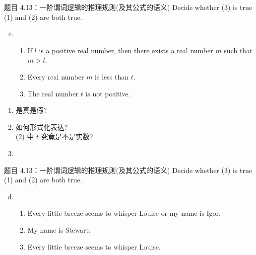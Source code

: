 \begin{frame}{}
  \begin{exampleblock}{题目 4.13：一阶谓词逻辑的推理规则(及其公式的语义)}
    Decide whether (3) is true  (1) and (2) are both true.

    \begin{enumerate}[(a)]
      \setcounter{enumi}{2}
      \item 
	\begin{enumerate}[(1)]
	  \item If $l$ is a positive real number, then there exists a real number $m$ such that $m > l$.
	  \item Every real number $m$ is less than $t$.
	  \item The real number $t$ is not positive.
	\end{enumerate}
    \end{enumerate}
  \end{exampleblock}

  \vspace{0.30cm}
  \begin{enumerate}
    \item 是真是假?
      \pause
    \item 如何形式化表达?\\
      \pause
      (2) 中 $t$ 究竟是不是实数?
      \pause
    \item {}
  \end{enumerate}
\end{frame}

\begin{frame}{}
  \begin{exampleblock}{题目 4.13：一阶谓词逻辑的推理规则(及其公式的语义)}
    Decide whether (3) is true  (1) and (2) are both true.

    \begin{enumerate}[(a)]
      \setcounter{enumi}{3}
      \item 
	\begin{enumerate}[(1)]
	  \item Every little breeze seems to whisper Louise or my name is Igor.
	  \item My name is Stewart.
	  \item Every little breeze seems to whisper Louise.
	\end{enumerate}
    \end{enumerate}
  \end{exampleblock}
\end{frame}


